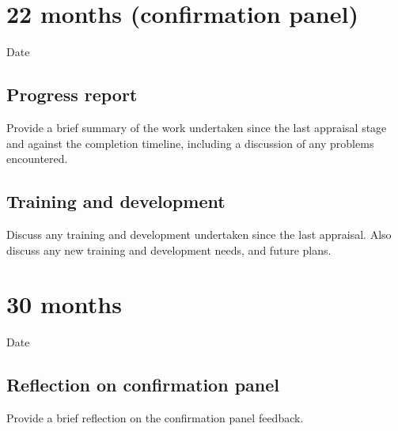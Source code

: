 \documentclass[12pt,a4paper]{article}
\begin{document}
\section{22 months (confirmation panel)}

\begin{description}
	\item[Date] %
\end{description}

\subsection{Progress report}
Provide a brief summary of the work undertaken since the last appraisal stage and against the completion timeline, including a discussion of any problems encountered. %

\subsection{Training and development}
Discuss any training and development undertaken since the last appraisal. Also discuss any new training and development needs, and future plans. %


\section{30 months}

\begin{description}
	\item[Date] %
\end{description}

\subsection{Reflection on confirmation panel}
Provide a brief reflection on the confirmation panel feedback. %
\end{document}
